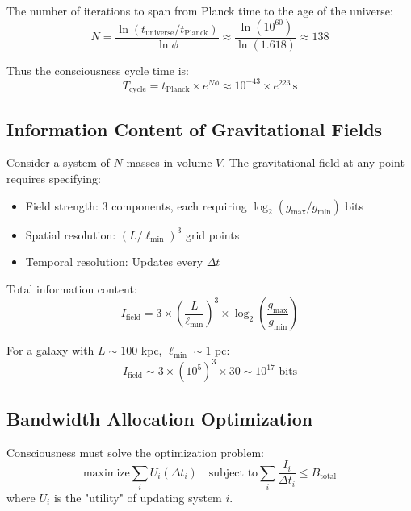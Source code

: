 \documentclass[twocolumn,prd,amsmath,amssymb,aps,superscriptaddress,nofootinbib]{revtex4-2}
\begin{document}
The number of iterations to span from Planck time to the age of the universe:
\begin{equation}
N = \frac{\ln(t_{\text{universe}}/t_{\text{Planck}})}{\ln \phi} \approx \frac{\ln(10^{60})}{\ln(1.618)} \approx 138
\end{equation}

Thus the consciousness cycle time is:
\begin{equation}
T_{\text{cycle}} = t_{\text{Planck}} \times e^{N\phi} \approx 10^{-43} \times e^{223} \,\text{s}
\end{equation}

\subsection{Information Content of Gravitational Fields}

Consider a system of $N$ masses in volume $V$. The gravitational field at any point requires specifying:
\begin{itemize}
\item Field strength: 3 components, each requiring $\log_2(g_{\text{max}}/g_{\text{min}})$ bits
\item Spatial resolution: $(L/\ell_{\text{min}})^3$ grid points
\item Temporal resolution: Updates every $\Delta t$
\end{itemize}

Total information content:
\begin{equation}
I_{\text{field}} = 3 \times \left(\frac{L}{\ell_{\text{min}}}\right)^3 \times \log_2\left(\frac{g_{\text{max}}}{g_{\text{min}}}\right)
\end{equation}

For a galaxy with $L \sim 100$ kpc, $\ell_{\text{min}} \sim 1$ pc:
\begin{equation}
I_{\text{field}} \sim 3 \times (10^5)^3 \times 30 \sim 10^{17} \text{ bits}
\end{equation}

\subsection{Bandwidth Allocation Optimization}

Consciousness must solve the optimization problem:
\begin{equation}
\text{maximize} \sum_i U_i(\Delta t_i) \quad \text{subject to} \sum_i \frac{I_i}{\Delta t_i} \leq B_{\text{total}}
\end{equation}
where $U_i$ is the "utility" of updating system $i$.
\end{document}
